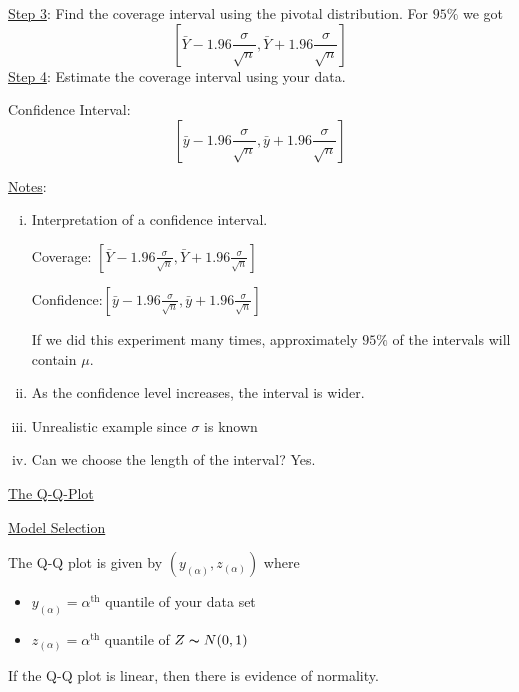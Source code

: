 \underline{Step 3}: Find the coverage interval using the pivotal distribution.
For $ 95\% $ we got
\[ \left[ \bar{Y}-1.96\frac{\sigma}{\sqrt{n}},
        \bar{Y}+1.96\frac{\sigma}{\sqrt{n}}\right] \] \underline{Step 4}: Estimate
the coverage interval using your data.

Confidence Interval:
\[ \left[ \bar{y}-1.96\frac{\sigma}{\sqrt{n}},
        \bar{y}+1.96\frac{\sigma}{\sqrt{n}}\right] \]

\underline{Notes}:
\begin{enumerate}[(i)]
    \item Interpretation of a confidence interval.

          Coverage: $ \left[ \bar{Y}-1.96\frac{\sigma}{\sqrt{n}},
                  \bar{Y}+1.96\frac{\sigma}{\sqrt{n}}\right] $

          Confidence:$ \left[ \bar{y}-1.96\frac{\sigma}{\sqrt{n}},
                  \bar{y}+1.96\frac{\sigma}{\sqrt{n}}\right] $

          If we did this experiment many times, approximately $ 95\% $ of the
          intervals will contain $ \mu $.

    \item As the confidence level increases, the interval is wider.
    \item Unrealistic example since $ \sigma $ is known
    \item Can we choose the length of the interval? Yes.
\end{enumerate}

\underline{The Q-Q-Plot}

\underline{Model Selection}

The Q-Q plot is given by $ (y_{(\alpha)},z_{(\alpha)}) $ where
\begin{itemize}
    \item $ y_{(\alpha)} = \alpha^{\text{th}} $ quantile of your data set
    \item $ z_{(\alpha)} = \alpha^{\text{th}}  $ quantile of $ Z \thicksim
              N(0,1) $
\end{itemize}
If the Q-Q plot is linear, then there is evidence of normality.

